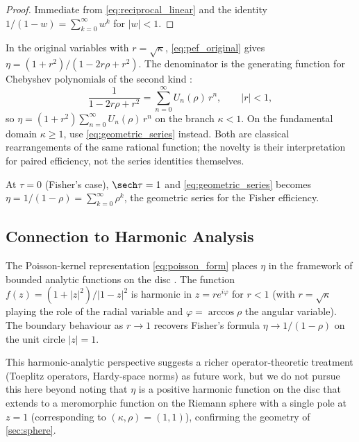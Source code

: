 \begin{proof}
Immediate from \cref{eq:reciprocal_linear} and the identity $1/(1-w) = \sum_{k=0}^{\infty}w^{k}$ for $|w| < 1$.
\end{proof}

\begin{remark}
In the original variables with $r = \sqrt{\kappa}$, \cref{eq:pef_original} gives $\eta = (1+r^{2})/(1-2r\rho+r^{2})$.  The denominator is the generating function for Chebyshev polynomials of the second kind \parencite{rivlin1990}:
\[
  \frac{1}{1-2r\rho+r^{2}} = \sum_{n=0}^{\infty}U_{n}(\rho)\,r^{n},
  \qquad |r| < 1,
\]
so $\eta = (1+r^{2})\sum_{n=0}^{\infty}U_{n}(\rho)\,r^{n}$ on the branch $\kappa < 1$.  On the fundamental domain $\kappa \ge 1$, use \cref{eq:geometric_series} instead.  Both are classical rearrangements of the same rational function; the novelty is their interpretation for paired efficiency, not the series identities themselves.
\end{remark}

\begin{remark}
At $\tau = 0$ (Fisher's case), $\sech\tau = 1$ and \cref{eq:geometric_series} becomes $\eta = 1/(1-\rho) = \sum_{k=0}^{\infty}\rho^{k}$, the geometric series for the Fisher efficiency.
\end{remark}

\subsection{Connection to Harmonic Analysis}
\label{sec:harmonic}

The Poisson-kernel representation \cref{eq:poisson_form} places $\eta$ in the framework of bounded analytic functions on the disc \parencite{garnett2007}.  The function $f(z) = (1+|z|^{2})/|1-z|^{2}$ is harmonic in $z = re^{i\varphi}$ for $r < 1$ (with $r = \sqrt{\kappa}$ playing the role of the radial variable and $\varphi = \arccos\rho$ the angular variable).  The boundary behaviour as $r \to 1$ recovers Fisher's formula $\eta \to 1/(1-\rho)$ on the unit circle $|z| = 1$.

This harmonic-analytic perspective suggests a richer operator-theoretic treatment (Toeplitz operators, Hardy-space norms) as future work, but we do not pursue this here beyond noting that $\eta$ is a positive harmonic function on the disc that extends to a meromorphic function on the Riemann sphere with a single pole at $z = 1$ (corresponding to $(\kappa,\rho) = (1,1)$), confirming the geometry of \cref{sec:sphere}.
